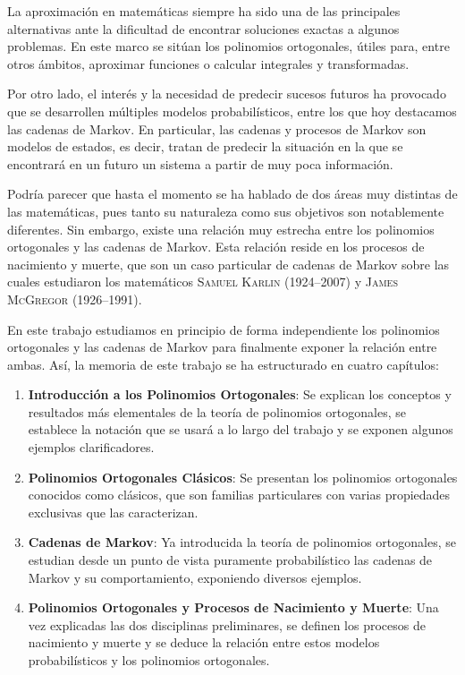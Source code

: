 
La aproximación en matemáticas siempre ha sido una de las principales alternativas ante la dificultad de encontrar soluciones exactas a algunos problemas. En este marco se sitúan los polinomios ortogonales, útiles para, entre otros ámbitos, aproximar funciones o calcular integrales y transformadas. 

Por otro lado, el interés y la necesidad de predecir sucesos futuros ha provocado que se desarrollen múltiples modelos probabilísticos, entre los que hoy destacamos las cadenas de Markov. En particular, las cadenas y procesos de Markov son modelos de estados, es decir, tratan de predecir la situación en la que se encontrará en un futuro un sistema a partir de muy poca información. 

Podría parecer que hasta el momento se ha hablado de dos áreas muy distintas de las matemáticas, pues tanto su naturaleza como sus objetivos son notablemente diferentes. Sin embargo, existe una relación muy estrecha entre los polinomios ortogonales y las cadenas de Markov. Esta relación reside en los procesos de nacimiento y muerte, que son un caso particular de cadenas de Markov sobre las cuales estudiaron los matemáticos \textsc{Samuel Karlin} (1924--2007) y \textsc{James McGregor} (1926--1991).

En este trabajo estudiamos en principio de forma independiente los polinomios ortogonales y las cadenas de Markov para finalmente exponer la relación entre ambas. Así, la memoria de este trabajo se ha estructurado en cuatro capítulos:

\begin{enumerate}
    \item \textbf{Introducción a los Polinomios Ortogonales}: Se explican los conceptos y resultados más elementales de la teoría de polinomios ortogonales, se establece la notación que se usará a lo largo del trabajo y se exponen algunos ejemplos clarificadores.
    \item \textbf{Polinomios Ortogonales Clásicos}: Se presentan los polinomios ortogonales conocidos como clásicos, que son familias particulares con varias propiedades exclusivas que las caracterizan.
    \item \textbf{Cadenas de Markov}: Ya introducida la teoría de polinomios ortogonales, se estudian desde un punto de vista puramente probabilístico las cadenas de Markov y su comportamiento, exponiendo diversos ejemplos.
    \item \textbf{Polinomios Ortogonales y Procesos de Nacimiento y Muerte}: Una vez explicadas las dos disciplinas preliminares, se definen los procesos de nacimiento y muerte y se deduce la relación entre estos modelos probabilísticos y los polinomios ortogonales.
\end{enumerate}

